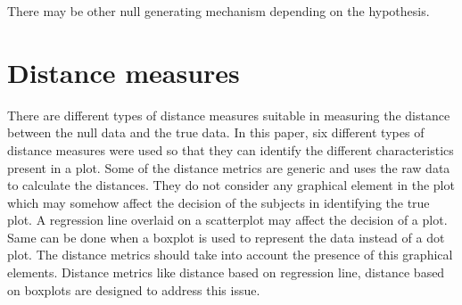 \documentclass[12]{article}
\newcommand{\blue}[1]{{\color{blue} #1}}
\newcommand{\red}[1]{{\color{red} #1}}
\begin{document}
There may be other null generating mechanism depending on the hypothesis. 

\section{Distance measures} \label{sec:meas}

%
%

%

There are different types of distance measures suitable in measuring the distance between the null data and the true data. In this paper, six different types of distance measures were used so that they can identify the different characteristics present in a plot. Some of the distance metrics are generic and uses the raw data to calculate the distances. They do not consider any graphical element in the plot which may somehow affect the decision of the subjects in identifying the true plot. A regression line overlaid on a scatterplot may affect the decision of a plot. Same can be done when a boxplot is used to represent the data instead of a dot plot. The distance metrics should take into account the presence of this graphical elements. Distance metrics like distance based on regression line, distance based on boxplots are designed to address this issue. \\
\end{document}
